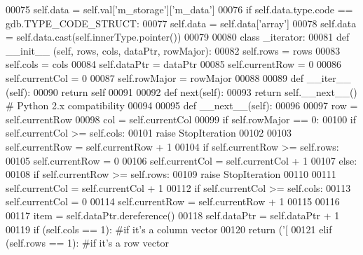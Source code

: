 \begin{DoxyCode}
00075         self.data = self.val[\textcolor{stringliteral}{'m\_storage'}][\textcolor{stringliteral}{'m\_data'}]
00076         \textcolor{keywordflow}{if} self.data.type.code == gdb.TYPE\_CODE\_STRUCT:
00077             self.data = self.data[\textcolor{stringliteral}{'array'}]
00078             self.data = self.data.cast(self.innerType.pointer())
00079             
00080     \textcolor{keyword}{class }\_iterator:
00081         \textcolor{keyword}{def }\_\_init\_\_ (self, rows, cols, dataPtr, rowMajor):
00082             self.rows = rows
00083             self.cols = cols
00084             self.dataPtr = dataPtr
00085             self.currentRow = 0
00086             self.currentCol = 0
00087             self.rowMajor = rowMajor
00088             
00089         \textcolor{keyword}{def }\_\_iter\_\_ (self):
00090             \textcolor{keywordflow}{return} self
00091 
00092         \textcolor{keyword}{def }next(self):
00093                         \textcolor{keywordflow}{return} self.\_\_next\_\_()  \textcolor{comment}{# Python 2.x compatibility}
00094 
00095         \textcolor{keyword}{def }\_\_next\_\_(self):
00096             
00097             row = self.currentRow
00098             col = self.currentCol
00099             \textcolor{keywordflow}{if} self.rowMajor == 0:
00100                 \textcolor{keywordflow}{if} self.currentCol >= self.cols:
00101                     \textcolor{keywordflow}{raise} StopIteration
00102                     
00103                 self.currentRow = self.currentRow + 1
00104                 \textcolor{keywordflow}{if} self.currentRow >= self.rows:
00105                     self.currentRow = 0
00106                     self.currentCol = self.currentCol + 1
00107             \textcolor{keywordflow}{else}:
00108                 \textcolor{keywordflow}{if} self.currentRow >= self.rows:
00109                     \textcolor{keywordflow}{raise} StopIteration
00110                     
00111                 self.currentCol = self.currentCol + 1
00112                 \textcolor{keywordflow}{if} self.currentCol >= self.cols:
00113                     self.currentCol = 0
00114                     self.currentRow = self.currentRow + 1
00115                 
00116             
00117             item = self.dataPtr.dereference()
00118             self.dataPtr = self.dataPtr + 1
00119             \textcolor{keywordflow}{if} (self.cols == 1): \textcolor{comment}{#if it's a column vector}
00120                 \textcolor{keywordflow}{return} (\textcolor{stringliteral}{'[%
00121             \textcolor{keywordflow}{elif} (self.rows == 1): \textcolor{comment}{#if it's a row vector}
}
\end{DoxyCode}
